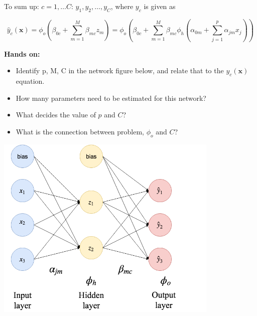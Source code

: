 \documentclass[10pt,ignorenonframetext,]{beamer}
\providecommand{\tightlist}{%
  \setlength{\itemsep}{0pt}\setlength{\parskip}{0pt}}
\begin{document}
\begin{frame}

To sum up: \(c=1,\ldots C\): \(y_1, y_2, \ldots, y_C\), where \(y_c\) is
given as

\[
\hat{y}_c({\boldsymbol x})=\phi_o(\beta_{0c}+\sum_{m=1}^M \beta_{mc}z_{m})=\phi_o(\beta_{0c}+\sum_{m=1}^M \beta_{mc}\phi_h(\alpha_{0m}+\sum_{j=1}^p \alpha_{jm}x_{j}))
\]

\textbf{Hands on:}

\begin{itemize}
\tightlist
\item
  Identify p, M, C in the network figure below, and relate that to the
  \(y_{c}({\boldsymbol x})\) equation.
\item
  How many parameters need to be estimated for this network?
\item
  What decides the value of \(p\) and \(C\)?
\item
  What is the connection between problem, \(\phi_o\) and \(C\)?
\end{itemize}

\end{frame}

\begin{frame}

\centering

\includegraphics[width=0.8\textwidth,height=\textheight]{drawNNp3h2o3.png}

\end{frame}
\end{document}
